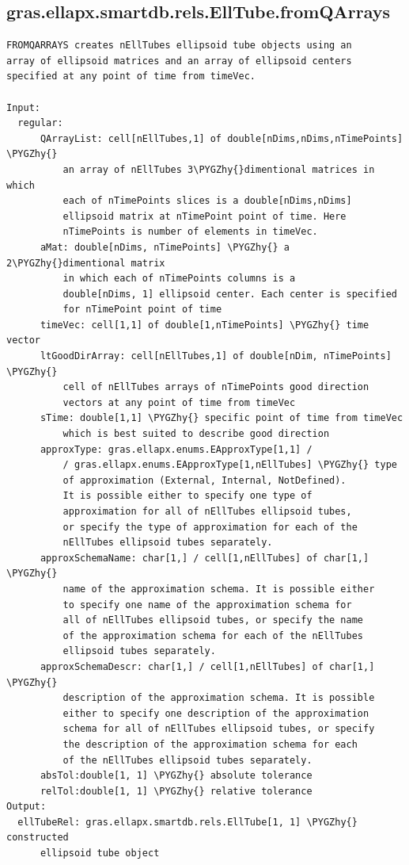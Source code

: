 \documentclass[letterpaper,10pt,english]{sphinxmanual}
\def\PYGZhy{\char`\-}
\begin{document}
\subsection{gras.ellapx.smartdb.rels.EllTube.fromQArrays}
\label{chap_functions:gras-ellapx-smartdb-rels-elltube-fromqarrays}
\begin{Verbatim}[commandchars=\\\{\}]
FROMQARRAYS creates nEllTubes ellipsoid tube objects using an
array of ellipsoid matrices and an array of ellipsoid centers
specified at any point of time from timeVec.

Input:
  regular:
      QArrayList: cell[nEllTubes,1] of double[nDims,nDims,nTimePoints] \PYGZhy{}
          an array of nEllTubes 3\PYGZhy{}dimentional matrices in which
          each of nTimePoints slices is a double[nDims,nDims]
          ellipsoid matrix at nTimePoint point of time. Here
          nTimePoints is number of elements in timeVec.
      aMat: double[nDims, nTimePoints] \PYGZhy{} a 2\PYGZhy{}dimentional matrix
          in which each of nTimePoints columns is a
          double[nDims, 1] ellipsoid center. Each center is specified
          for nTimePoint point of time
      timeVec: cell[1,1] of double[1,nTimePoints] \PYGZhy{} time vector
      ltGoodDirArray: cell[nEllTubes,1] of double[nDim, nTimePoints] \PYGZhy{}
          cell of nEllTubes arrays of nTimePoints good direction
          vectors at any point of time from timeVec
      sTime: double[1,1] \PYGZhy{} specific point of time from timeVec
          which is best suited to describe good direction
      approxType: gras.ellapx.enums.EApproxType[1,1] /
          / gras.ellapx.enums.EApproxType[1,nEllTubes] \PYGZhy{} type
          of approximation (External, Internal, NotDefined).
          It is possible either to specify one type of
          approximation for all of nEllTubes ellipsoid tubes,
          or specify the type of approximation for each of the
          nEllTubes ellipsoid tubes separately.
      approxSchemaName: char[1,] / cell[1,nEllTubes] of char[1,] \PYGZhy{}
          name of the approximation schema. It is possible either
          to specify one name of the approximation schema for
          all of nEllTubes ellipsoid tubes, or specify the name
          of the approximation schema for each of the nEllTubes
          ellipsoid tubes separately.
      approxSchemaDescr: char[1,] / cell[1,nEllTubes] of char[1,] \PYGZhy{}
          description of the approximation schema. It is possible
          either to specify one description of the approximation
          schema for all of nEllTubes ellipsoid tubes, or specify
          the description of the approximation schema for each
          of the nEllTubes ellipsoid tubes separately.
      absTol:double[1, 1] \PYGZhy{} absolute tolerance
      relTol:double[1, 1] \PYGZhy{} relative tolerance
Output:
  ellTubeRel: gras.ellapx.smartdb.rels.EllTube[1, 1] \PYGZhy{} constructed
      ellipsoid tube object
\end{Verbatim}
\end{document}

